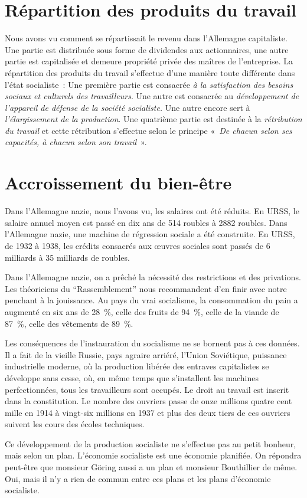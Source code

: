 \documentclass[french,twoside]{book} %
\begin{document}
\section[{Répartition des produits du travail}]{Répartition des produits du travail}
\noindent Nous avons vu comment se répartissait le revenu dans l’Allemagne capitaliste. Une partie est distribuée sous forme de dividendes aux actionnaires, une autre partie est capitalisée et demeure propriété privée des maîtres de l’entreprise. La répartition des produits du travail s’effectue d’une manière toute différente dans l’état socialiste : Une première partie est consacrée \emph{à la satisfaction des besoins sociaux et culturels des travailleurs}. Une autre est consacrée au \emph{développement de l’appareil de défense de la société socialiste.} Une autre encore sert à \emph{l’élargissement de la production}. Une quatrième partie est destinée à la \emph{rétribution du travail} et cette rétribution s’effectue selon le principe « \emph{De chacun selon ses capacités, à chacun selon son travail} ».
\section[{Accroissement du bien-être}]{Accroissement du bien-être}
\noindent Dans l’Allemagne nazie, nous l’avons vu, les salaires ont été réduits. En URSS, le salaire annuel moyen est passé en dix ans de 514 roubles à 2882 roubles. Dans l’Allemagne nazie, une machine de régression sociale a été construite. En URSS, de 1932 à 1938, les crédits consacrés aux œuvres sociales sont passés de 6 milliards à 35 milliards de roubles.\par
Dans l’Allemagne nazie, on a prêché la nécessité des restrictions et des privations. Les théoriciens du “Rassemblement” nous recommandent d’en finir avec notre penchant à la jouissance. Au pays du vrai socialisme, la consommation du pain a augmenté en six ans de 28 \%, celle des fruits de 94 \%, celle de la viande de 87 \%, celle des vêtements de 89 \%.\par
Les conséquences de l’instauration du socialisme ne se bornent pas à ces données. Il a fait de la vieille Russie, pays agraire arriéré, l’Union Soviétique, puissance industrielle moderne, où la production libérée des entraves capitalistes se développe sans cesse, où, en même temps que s’installent les machines perfectionnées, tous les travailleurs sont occupés. Le droit au travail est inscrit dans la constitution. Le nombre des ouvriers passe de onze millions quatre cent mille en 1914 à vingt-six millions en 1937 et plus des deux tiers de ces ouvriers suivent les cours des écoles techniques.\par
Ce développement de la production socialiste ne s’effectue pas au petit bonheur, mais selon un plan. L’économie socialiste est une économie planifiée. On répondra peut-être que monsieur Göring aussi a un plan et monsieur Bouthillier de même. Oui, mais il n’y a rien de commun entre ces plans et les plans d’économie socialiste.
\end{document}
